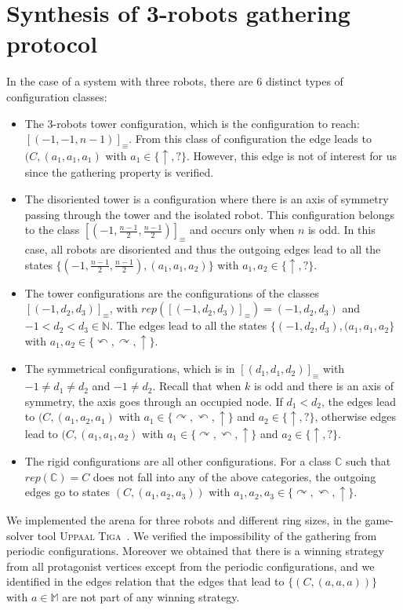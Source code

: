 \documentclass[envcountsame]{llncs} \usepackage[english]{babel}
\newcommand{\N}{\ensuremath{\mathbb{N}}}
\newcommand{\equivclass}[1]{[#1]_\equiv}
\newcommand{\Act}{\ensuremath{\mathbb{M}}}
\newcommand{\rep}{\ensuremath{\mathit{rep}}}
\newcommand{\clockwise}{\ensuremath{\curvearrowright}}
\newcommand{\counterclockwise}{\ensuremath{\curvearrowleft}}
\newcommand{\still}{\ensuremath{\uparrow}}
\newcommand{\disoriented}{?}
\begin{document}
\section{Synthesis of 3-robots gathering protocol}
In the case of a system with three robots, there are $6$ distinct types of configuration classes:  
\begin{itemize}
	\item The 3-robots tower configuration, which is the configuration to reach: $\equivclass{(-1, -1, n-1)}$.
From this class of configuration  
the edge leads to $(C,(a_1, a_1,a_1)$ with $a_1 \in\{\still,\disoriented\}$. However, this edge is not of interest for us since the gathering property is verified.
	\item The disoriented tower is a configuration where there is an axis of symmetry passing through 
the tower and the isolated robot.
This configuration belongs to the class $\equivclass{(-1, \frac{n-1}{2}, \frac{n-1}{2})}$ and occurs only when $n$ is odd.  
In this case, all robots are disoriented and thus the outgoing edges lead to all the states $\{(-1, \frac{n-1}{2}, \frac{n-1}{2}), (a_1,a_1, a_2)\}$
with $a_1, a_2\in\{\still,\disoriented\}$.
	\item The tower configurations are the configurations of the classes $\equivclass{(-1, d_2, d_3)}$, 
with $rep(\equivclass{(-1, d_2, d_3)}) = (-1, d_2, d_3)$ and $-1<d_2< d_3 \in \N$.
The edges lead to all the states $\{(-1, d_2, d_3), (a_1,a_1,a_2\}$ with $a_1,a_2\in\{\counterclockwise,\clockwise,\still\}$.
	\item The symmetrical configurations, which is in $\equivclass{(d_1,d_1,d_2)}$ with $-1\neq d_1 \neq d_2$ and $-1 \neq d_{2}$.
 Recall that when $k$ is odd and there is an axis of symmetry, the axis goes through an occupied node.
If $d_1 < d_2$, the edges lead to $(C,(a_1,a_2, a_1)$ with $a_1\in\{\clockwise, \counterclockwise,\still\}$ and $a_2\in\{\still,\disoriented\}$, 
otherwise edges lead to $(C,(a_1,a_1, a_2)$ with $a_1\in\{\clockwise, \counterclockwise,\still\}$ and $a_2\in\{\still,\disoriented\}$.
	\item The rigid configurations are all other configurations. For a class $\mathbb{C}$ such that $\rep(\mathbb{C})=C$
does not fall into any of the above categories, 
the outgoing edges go to states $(C, (a_1,a_2,a_3))$ with $a_1,a_2,a_3\in \{\clockwise, \counterclockwise, \still\}$. 
\end{itemize}


We implemented the arena for three robots and different ring sizes, in the game-solver tool \textsc{Uppaal Tiga}~\cite{UPPAAL-TIGA}. 
We verified the impossibility of the gathering from periodic configurations.
Moreover we obtained that there is a winning strategy from all protagonist vertices except from the periodic configurations, 
and we identified in the edges relation that the edges that lead to $\{(C,(a,a,a))\}$ with $a \in \Act$ are not part of any winning strategy.
\end{document}
